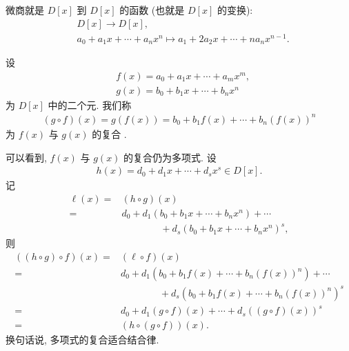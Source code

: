 \begin{remark}
    微商就是 $D[x]$ 到 $D[x]$ 的函数 (也就是 $D[x]$ 的变换):
    \begin{align*}
         & D[x] \to D[x], \tag*{$\prime \colon$}                                        \\
         & a_0 + a_1 x + \cdots + a_n x^n \mapsto a_1 + 2a_2 x + \cdots + na_n x^{n-1}.
    \end{align*}
\end{remark}

\begin{definition}
    设
    \begin{align*}
         & f(x) = a_0 + a_1 x + \cdots + a_m x^m, \\
         & g(x) = b_0 + b_1 x + \cdots + b_n x^n
    \end{align*}
    为 $D[x]$ 中的二个元. 我们称
    \begin{align*}
        (g \circ f)(x) = g(f(x)) = b_0 + b_1 f(x) + \cdots + b_n (f(x))^n
    \end{align*}
    为 $f(x)$ 与 $g(x)$ 的复合 .
\end{definition}

\begin{remark}
    可以看到, $f(x)$ 与 $g(x)$ 的复合仍为多项式. 设
    \begin{align*}
        h(x) = d_0 + d_1 x + \cdots + d_s x^s \in D[x].
    \end{align*}
    记
    \begin{align*}
        \ell(x)
        = {} & (h \circ g) (x)                                         \\
        = {} & d_0 + d_1 (b_0 + b_1 x + \cdots + b_n x^n) + \cdots     \\
             & \qquad \qquad + d_s (b_0 + b_1 x + \cdots + b_n x^n)^s,
    \end{align*}
    则
    \begin{align*}
        ((h \circ g) \circ f) (x)
        = {} & (\ell \circ f) (x)                                             \\
        = {} & d_0 + d_1 (b_0 + b_1 f(x) + \cdots + b_n (f(x))^n) + \cdots    \\
             & \qquad \qquad + d_s (b_0 + b_1 f(x) + \cdots + b_n (f(x))^n)^s \\
        = {} & d_0 + d_1 (g \circ f) (x) + \cdots + d_s ((g \circ f) (x))^s   \\
        = {} & (h \circ (g \circ f)) (x).
    \end{align*}
    换句话说, 多项式的复合适合结合律.
\end{remark}

